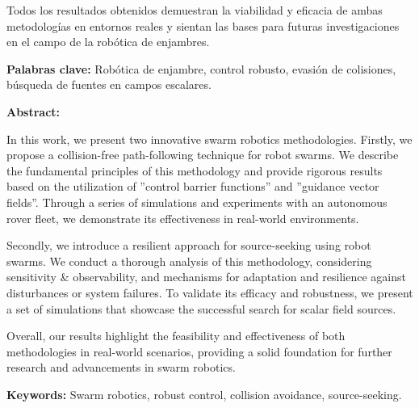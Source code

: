 Todos los resultados obtenidos demuestran la viabilidad y eficacia de ambas metodologías en entornos reales y sientan las bases para futuras investigaciones en el campo de la robótica de enjambres.

\vspace{0.5cm}

{\bfseries Palabras clave:} Robótica de enjambre, control robusto, evasión de colisiones, búsqueda de fuentes en campos escalares.

\vspace{1cm}

{\bfseries \large Abstract: }\vspace{5mm} 

In this work, we present two innovative swarm robotics methodologies. Firstly, we propose a collision-free path-following technique for robot swarms. We describe the fundamental principles of this methodology and provide rigorous results based on the utilization of ''control barrier functions'' and ''guidance vector fields''. Through a series of simulations and experiments with an autonomous rover fleet, we demonstrate its effectiveness in real-world environments.

Secondly, we introduce a resilient approach for source-seeking using robot swarms. We conduct a thorough analysis of this methodology, considering sensitivity \& observability, and mechanisms for adaptation and resilience against disturbances or system failures. To validate its efficacy and robustness, we present a set of simulations that showcase the successful search for scalar field sources.

Overall, our results highlight the feasibility and effectiveness of both methodologies in real-world scenarios, providing a solid foundation for further research and advancements in swarm robotics.

\vspace{0.5cm}

{\bfseries  Keywords:} Swarm robotics, robust control, collision avoidance, source-seeking.

